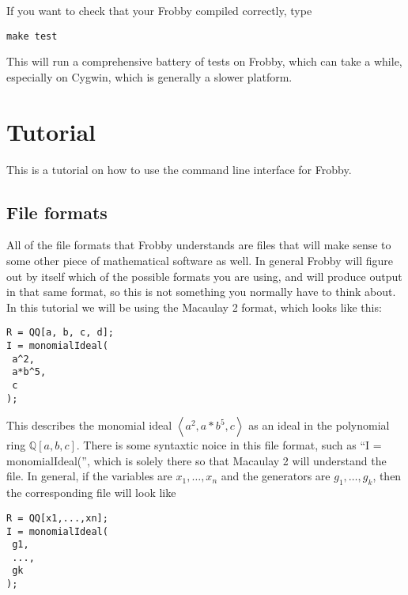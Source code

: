 \documentclass{amsart}
\theoremstyle{definition}
\newcommand{\Q}{\mathbb{Q}}
\newcommand{\ideal}[1]{\left<#1\right>}
\begin{document}
If you want to check that your Frobby compiled correctly, type
\begin{verbatim}
make test
\end{verbatim}
This will run a comprehensive battery of tests on Frobby, which can
take a while, especially on Cygwin, which is generally a slower
platform.

\section{Tutorial}

This is a tutorial on how to use the command line interface for
Frobby.

\subsection{File formats}

All of the file formats that Frobby understands are files that will
make sense to some other piece of mathematical software as well. In
general Frobby will figure out by itself which of the possible formats
you are using, and will produce output in that same format, so this is
not something you normally have to think about. In this tutorial we
will be using the Macaulay 2 format, which looks like this:
\begin{verbatim}
R = QQ[a, b, c, d];
I = monomialIdeal(
 a^2,
 a*b^5,
 c
);
\end{verbatim}
This describes the monomial ideal $\ideal{a^2,a*b^5,c}$ as an ideal in
the polynomial ring $\Q[a,b,c]$. There is some syntaxtic noice in this
file format, such as ``I = monomialIdeal('', which is solely there so
that Macaulay 2 will understand the file. In general, if the variables
are $x_1,\ldots,x_n$ and the generators are $g_1,\ldots,g_k$, then the
corresponding file will look like
\begin{verbatim}
R = QQ[x1,...,xn];
I = monomialIdeal(
 g1,
 ...,
 gk
);
\end{verbatim}
\end{document}
